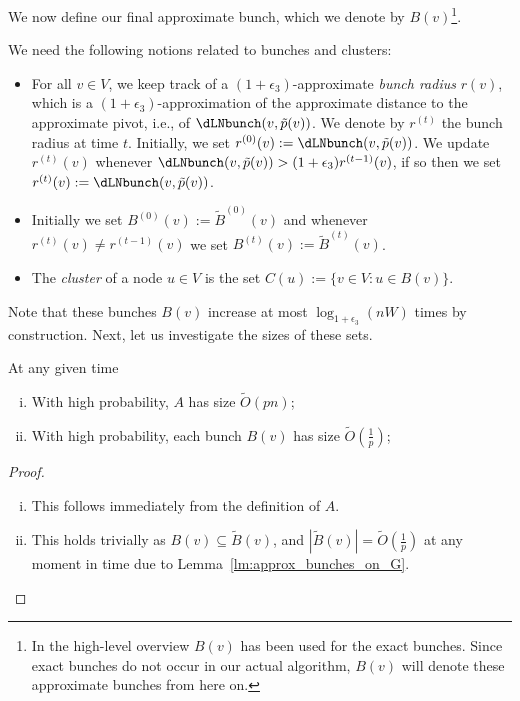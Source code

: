 We now define our final approximate bunch, which we denote by $B(v)$\footnote{In the high-level overview $B(v)$ has been used for the exact bunches. Since exact bunches do not occur in our actual algorithm, $B(v)$ will denote these approximate bunches from here on.}.
\begin{definition}\label{def:app_app_bunch}
We need the following notions related to bunches and clusters:
\begin{itemize}
    \item For all $v \in V$, we keep track of a $(1+\epsilon_3)$-approximate \emph{bunch radius} $r(v)$, which is a $(1+\epsilon_3)$-approximation of the approximate distance to the approximate pivot, i.e., of $\dLNbunch(v,\tilde{p}(v))$. We denote by $r^{(t)}$ the bunch radius at time $t$. Initially, we set $r^{(0)}(v):=\dLNbunch(v,\tilde{p}(v))$. We update $r^{(t)}(v)$ whenever $\dLNbunch(v,\tilde{p}(v)) > (1+\epsilon_3)r^{(t-1)}(v)$, if so then we set $r^{(t)}(v):=\dLNbunch(v,\tilde{p}(v))$.
    \item Initially we set $B^{(0)}(v):= \tilde B^{(0)}(v)$ and whenever $r^{(t)}(v)\neq r^{(t-1)}(v)$ we set $B^{(t)}(v):=\tilde B^{(t)}(v)$.
    \item The \textit{cluster} of a node $u\in V$ is the set $C(u):= \{ v \in V: u \in B(v) \}$.
\end{itemize}    
\end{definition}


 Note that these bunches $B(v)$ increase at most $\log_{1+\epsilon_3}(nW)$ times by construction.
Next, let us investigate the sizes of these sets. 

\begin{lemma}\label{lm:size_heavy}
 At any given time
\begin{enumerate}[(i)]
    \item With high probability, $ A $ has size $\tilde O (p n) $; \label{item:size_A}
    \item With high probability, each bunch $B(v)$ has size $\tilde O (\tfrac{1}{p}) $;  \label{item:size_bunch}
\end{enumerate}
\end{lemma}
\begin{proof}
\begin{enumerate}[(i)]
    \item This follows immediately from the definition of $A$. 
    \item This holds trivially as $B(v)\subseteq \tilde B(v)$, and $|\tilde{B}(v)|=\tilde O(\tfrac{1}{p})$ at any moment in time due to Lemma~\ref{lm:approx_bunches_on_G}.\qedhere
\end{enumerate}
\end{proof}


